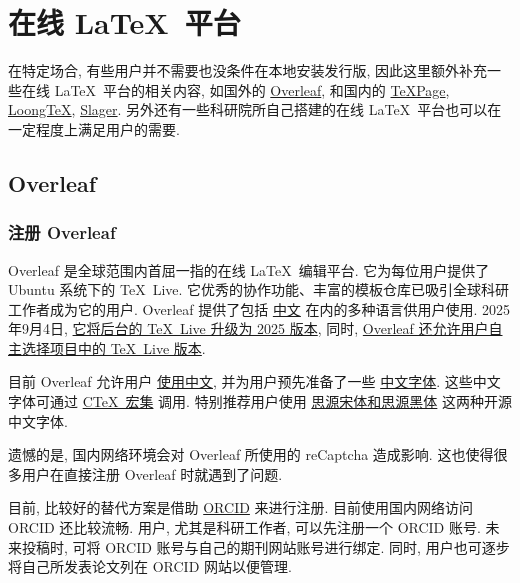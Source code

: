 
\chapter{在线 \LaTeX\ 平台}

在特定场合,
有些用户并不需要也没条件在本地安装发行版,
因此这里额外补充一些在线 \LaTeX\ 平台的相关内容,
如国外的 \href{https://www.overleaf.com/}{Overleaf},
和国内的 \href{https://www.texpage.com/}{TeXPage},
\href{https://www.loongtex.com/}{LoongTeX},
\href{https://www.slager.link/#/Home}{Slager}.
另外还有一些科研院所自己搭建的在线 \LaTeX\ 平台也可以在一定程度上满足用户的需要.

\section{Overleaf}

\subsection{注册 Overleaf}

Overleaf 是全球范围内首屈一指的在线 \LaTeX\ 编辑平台.
它为每位用户提供了 Ubuntu 系统下的 \TeX~Live.
它优秀的协作功能、丰富的模板仓库已吸引全球科研工作者成为它的用户.
Overleaf 提供了包括%
\href{https://cn.overleaf.com/}{中文}%
在内的多种语言供用户使用.
2025年9月4日,
\href{https://www.overleaf.com/blog/tex-live-2025-is-now-available}{它将后台的 \TeX~Live 升级为 2025 版本},
同时,
\href{https://www.overleaf.com/blog/new-feature-select-your-tex-live-compiler-version}{Overleaf 还允许用户自主选择项目中的 \TeX~Live 版本}.

目前 Overleaf 允许用户%
\href{https://www.overleaf.com/learn/latex/Chinese}{使用中文},
并为用户预先准备了一些%
\href{https://www.overleaf.com/learn/latex/Questions/Which_OTF_or_TTF_fonts_are_supported_via_fontspec%3F#Fonts_for_CJK}{中文字体}.
这些中文字体可通过%
\href{https://www.overleaf.com/latex/templates/using-the-ctex-package-on-overleaf-zai-overleafping-tai-shang-shi-yong-ctex/gndvpvsmjcqx}{C\TeX\ 宏集}%
调用.
特别推荐用户使用%
\href{https://www.overleaf.com/latex/examples/demonstration-of-noto-serif-cjk-and-noto-sans-cjk-fonts/sgrwgcddtqsq}{思源宋体和思源黑体}%
这两种开源中文字体.

遗憾的是,
国内网络环境会对 Overleaf 所使用的 reCaptcha 造成影响.
这也使得很多用户在直接注册 Overleaf 时就遇到了问题.

目前,
比较好的替代方案是借助 \href{https://orcid.org/}{ORCID} 来进行注册.
目前使用国内网络访问 ORCID 还比较流畅.
用户, 尤其是科研工作者, 可以先注册一个 ORCID 账号.
未来投稿时,
可将 ORCID 账号与自己的期刊网站账号进行绑定.
同时,
用户也可逐步将自己所发表论文列在 ORCID 网站以便管理.

